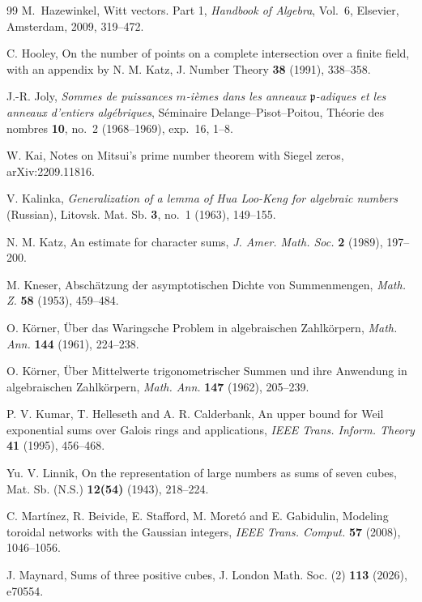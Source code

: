 \documentclass[11pt,letterpaper]{article}
\theoremstyle{definition}
\numberwithin{equation}{section}
\begin{document}
\begin{thebibliography}{99}
M.~Hazewinkel, Witt vectors. Part 1, \emph{Handbook of Algebra}, Vol.~6, Elsevier, Amsterdam, 2009, 319--472.

C. Hooley, On the number of points on a complete intersection over a finite field, with an appendix by N. M. Katz, J. Number Theory \textbf{38} (1991), 338--358.

J.-R. Joly, \emph{Sommes de puissances $m$-i\`emes dans les anneaux $\mathfrak p$-adiques et les anneaux d'entiers alg\'ebriques}, S\'eminaire Delange--Pisot--Poitou, Th\'eorie des nombres \textbf{10}, no.~2 (1968--1969), exp.~16, 1--8.

W. Kai, Notes on Mitsui's prime number theorem with Siegel zeros, arXiv:2209.11816.

V. Kalinka, \emph{Generalization of a lemma of Hua Loo-Keng for algebraic numbers} (Russian), Litovsk. Mat. Sb. \textbf{3}, no.~1 (1963), 149--155.

N. M. Katz, An estimate for character sums,
\emph{J. Amer. Math. Soc.} \textbf{2} (1989), 197--200.

M. Kneser, Absch\"atzung der asymptotischen Dichte von Summenmengen,
\emph{Math. Z.} \textbf{58} (1953), 459--484.

O. K\"orner, \"Uber das Waringsche Problem in algebraischen Zahlk\"orpern,
\emph{Math. Ann.} \textbf{144} (1961), 224--238.

O. K\"orner, \"Uber Mittelwerte trigonometrischer Summen und ihre
Anwendung in algebraischen Zahlk\"orpern,
\emph{Math. Ann.} \textbf{147} (1962), 205--239.

P. V. Kumar, T. Helleseth and A. R. Calderbank,
An upper bound for Weil exponential sums over Galois rings and applications,
\emph{IEEE Trans. Inform. Theory} \textbf{41} (1995), 456--468.

Yu. V. Linnik, On the representation of large numbers as sums of seven cubes, Mat. Sb. (N.S.) \textbf{12(54)} (1943), 218--224.

C. Mart\'inez, R. Beivide, E. Stafford, M. Moret\'o and E. Gabidulin,
Modeling toroidal networks with the Gaussian integers,
\emph{IEEE Trans. Comput.} \textbf{57} (2008), 1046--1056.

J. Maynard, Sums of three positive cubes, J. London Math. Soc. (2) \textbf{113} (2026), e70554.


\end{thebibliography}
\end{document}
